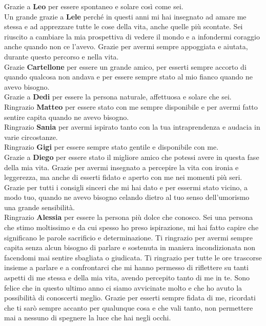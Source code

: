 \noindent Grazie a \textbf{Leo} per essere spontaneo e solare così come sei. \\


\noindent Un grande grazie a \textbf{Lele} perché in questi anni mi hai insegnato ad amare me stessa e ad apprezzare tutte le cose della vita, anche quelle più scontate. Sei riuscito a cambiare la mia prospettiva di vedere il mondo e a infondermi coraggio anche quando non ce l'avevo. Grazie per avermi sempre appoggiata e aiutata, durante questo percorso e nella vita.\\

\noindent Grazie \textbf{Cartellone} per essere un grande amico, per esserti sempre accorto di quando qualcosa non andava e per essere sempre stato al mio fianco quando ne avevo bisogno.\\


\noindent Grazie a \textbf{Dedi} per essere la persona naturale, affettuosa e solare che sei.  \\

\noindent Ringrazio \textbf{Matteo} per essere stato con me sempre disponibile e per avermi fatto sentire capita quando ne avevo bisogno.\\

\noindent Ringrazio \textbf{Sania} per avermi ispirato tanto con la tua intraprendenza e audacia in varie circostanze.\\

\noindent Ringrazio \textbf{Gigi} per essere sempre stato gentile e disponibile con me.\\

\noindent Grazie a \textbf{Diego} per essere stato il migliore amico che potessi avere in questa fase della mia vita. Grazie per avermi insegnato a percepire la vita con ironia e leggerezza, ma anche di esserti fidato e aperto con me nei momenti più seri. Grazie per tutti i consigli sinceri che mi hai dato e per essermi stato vicino, a modo tuo, quando ne avevo bisogno celando dietro al tuo senso dell'umorismo una grande sensibilità.\\


\noindent Ringrazio \textbf{Alessia} per essere la persona più dolce che conosco. Sei una persona che stimo moltissimo e da cui spesso ho preso ispirazione, mi hai fatto capire che significano le parole sacrificio e determinazione. Ti ringrazio per avermi sempre capita senza alcun bisogno di parlare e sostenuta in maniera incondizionata non facendomi mai sentire sbagliata o giudicata. Ti ringrazio per tutte le ore trascorse insieme a parlare e a confrontarci che mi hanno permesso di riflettere su tanti aspetti di me stessa e della mia vita, avendo percepito tanto di me in te. Sono felice che in questo ultimo anno ci siamo avvicinate molto e che ho avuto la possibilità di conoscerti meglio. Grazie per esserti sempre fidata di me, ricordati che ti sarò sempre accanto per qualunque cosa e che vali tanto, non permettere mai a nessuno di spegnere la luce che hai negli occhi.\\ 


